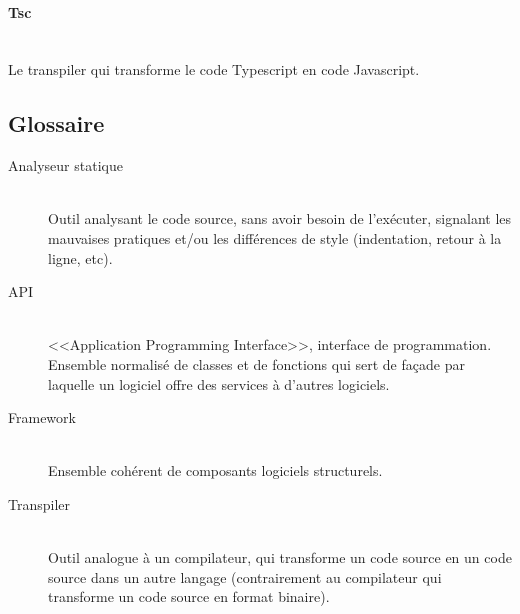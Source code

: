 \documentclass[a4paper,french,12pt]{article}
\begin{document}
		\paragraph{Tsc}~\\	
		Le transpiler qui transforme le code Typescript en code Javascript.

	\subsection{Glossaire}
		\begin{description}
		
		\item [Analyseur statique]~\\
			Outil analysant le code source, sans avoir besoin de l'exécuter, signalant les mauvaises pratiques et/ou les différences de style (indentation, retour à la ligne, etc).

		\item [API]~\\
		    <<Application Programming Interface>>, interface de programmation. Ensemble normalisé de classes et de
		    fonctions qui sert de façade par laquelle un logiciel offre des services à d'autres logiciels.

		\item [Framework]~\\
		    Ensemble cohérent de composants logiciels structurels.
		    
		\item [Transpiler]~\\
			Outil analogue à un compilateur, qui transforme un code source en un code source dans un autre langage (contrairement au compilateur qui transforme un code source en format binaire).
		

		\end{description}
\end{document}
